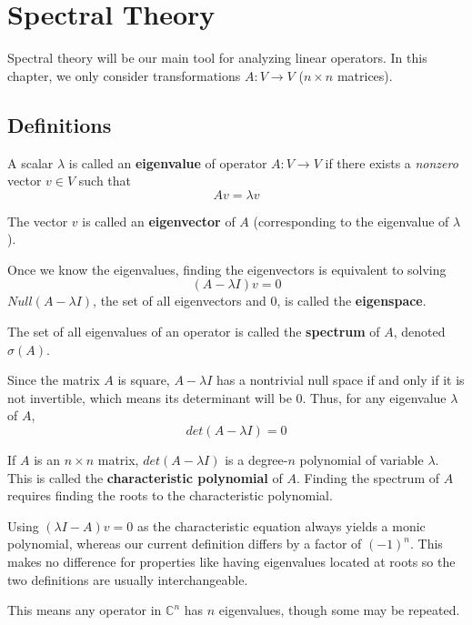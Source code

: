 \chapter{Spectral Theory}
Spectral theory will be our main tool for analyzing linear operators. In this chapter, we only consider transformations $A: V \rightarrow V$ ($n \times n$ matrices). 

\section{Definitions}

\begin{definition}
A scalar $\lambda$ is called an \textbf{eigenvalue} of operator $A: V \rightarrow V$ if there exists a \textit{nonzero} vector $v \in V$ such that 
$$Av = \lambda v$$

The vector $v$ is called an \textbf{eigenvector} of $A$ (corresponding to the eigenvalue of $\lambda$).

Once we know the eigenvalues, finding the eigenvectors is equivalent to solving 
$$(A - \lambda I)v = 0$$
$Null(A - \lambda I)$, the set of all eigenvectors and 0, is called the \textbf{eigenspace}. 

The set of all eigenvalues of an operator is called the \textbf{spectrum} of $A$, denoted $\sigma (A)$. 
\end{definition}

Since the matrix $A$ is square, $A - \lambda I$ has a nontrivial null space if and only if it is not invertible, which means its determinant will be 0. Thus, for any eigenvalue $\lambda$ of $A$, 
$$det(A - \lambda I) = 0$$

\begin{definition}
If $A$ is an $n \times n$ matrix, $det(A - \lambda I)$ is a degree-$n$ polynomial of variable $\lambda$. This is called the \textbf{characteristic polynomial} of $A$. Finding the spectrum of $A$ requires finding the roots to the characteristic polynomial. 

Using $(\lambda I - A)v = 0$ as the characteristic equation always yields a monic polynomial, whereas our current definition differs by a factor of $(-1)^{n}$. This makes no difference for properties like having eigenvalues located at roots so the two definitions are usually interchangeable. 

This means any operator in $\mathbb{C}^{n}$ has $n$ eigenvalues, though some may be repeated. 
\end{definition}

